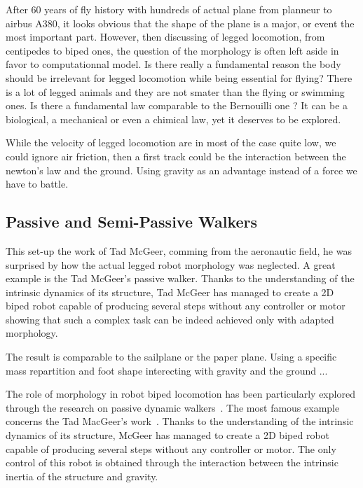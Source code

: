 \begin{figure}[]
\centering
    \hfil
    \caption{}
    \label{fig:}
\end{figure}

After 60 years of fly history with hundreds of actual plane from planneur to airbus A380, it looks obvious that the shape of the plane is a major, or event the most important part. However, then discussing of legged locomotion, from centipedes to biped ones, the question of the morphology is often left aside in favor to computationnal model. Is there really a fundamental reason the body should be irrelevant for legged locomotion while being essential for flying? There is a lot of legged animals and they are not smater than the flying or swimming ones. Is there a fundamental law comparable to the Bernouilli one ? It can be a biological, a mechanical or even a chimical law, yet it deserves to be explored.

While the velocity of legged locomotion are in most of the case quite low, we could ignore air friction, then a first track could be the interaction between the newton's law and the ground. Using gravity as an advantage instead of a force we have to battle.

\subsection{Passive and Semi-Passive Walkers} %

This set-up the work of Tad McGeer, comming from the aeronautic field, he was surprised by how the actual legged robot morphology was neglected. A great example is the Tad McGeer's passive walker. Thanks to the understanding of the intrinsic dynamics of its structure, Tad McGeer has managed to create a 2D biped robot capable of producing several steps without any controller or motor showing that such a complex task can be indeed achieved only with adapted morphology\cite{mcgeer1990passive}.

The result is comparable to the sailplane or the paper plane. Using a specific mass repartition and foot shape interecting with gravity and the ground ...

The role of morphology in robot biped locomotion has been particularly explored through the research on passive dynamic walkers~\cite{wisse2007passive}.
The most famous example concerns the Tad MacGeer's work~\cite{mcgeer1990passive}.
Thanks to the understanding of the intrinsic dynamics of its structure, McGeer has managed to create a 2D biped robot capable of producing several steps without any controller or motor.
The only control of this robot is obtained through the interaction between the intrinsic inertia of the structure and gravity.

